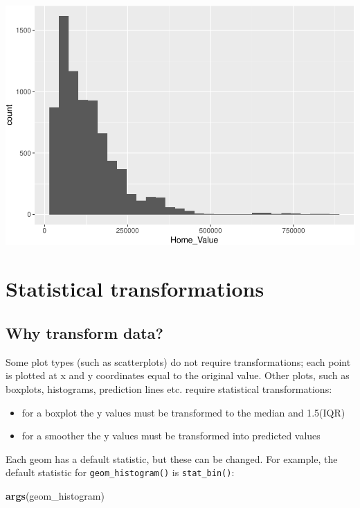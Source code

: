 \documentclass[]{book}
\newenvironment{Shaded}{\begin{snugshade}}{\end{snugshade}}
\newcommand{\KeywordTok}[1]{\textcolor[rgb]{0.13,0.29,0.53}{\textbf{#1}}}
\newcommand{\NormalTok}[1]{#1}
\providecommand{\tightlist}{%
  \setlength{\itemsep}{0pt}\setlength{\parskip}{0pt}}
\begin{document}
\includegraphics{R/Rgraphics/figures/unnamed-chunk-163-1.pdf}

\hypertarget{statistical-transformations}{%
\section{Statistical transformations}\label{statistical-transformations}}

\hypertarget{why-transform-data}{%
\subsection{Why transform data?}\label{why-transform-data}}

Some plot types (such as scatterplots) do not require transformations; each point is plotted at x and y coordinates equal to the original value. Other plots, such as boxplots, histograms, prediction lines etc. require statistical transformations:

\begin{itemize}
\tightlist
\item
  for a boxplot the y values must be transformed to the median and 1.5(IQR)
\item
  for a smoother the y values must be transformed into predicted values
\end{itemize}

Each geom has a default statistic, but these can be changed. For example, the default statistic for \texttt{geom\_histogram()} is \texttt{stat\_bin()}:

\begin{Shaded}
\begin{Highlighting}[]
\KeywordTok{args}\NormalTok{(geom_histogram)}
\end{Highlighting}
\end{Shaded}
\end{document}
